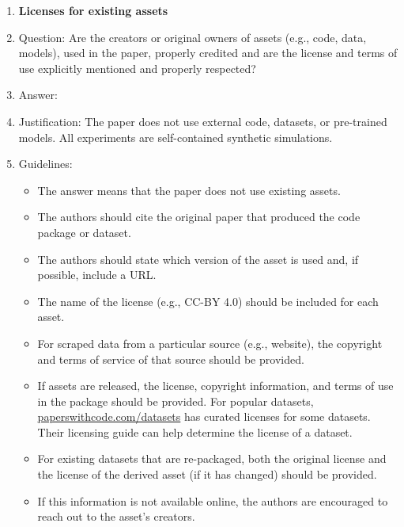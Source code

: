 \documentclass{article}
\begin{document}
\begin{enumerate}
\item {\bf Licenses for existing assets}
    \item[] Question: Are the creators or original owners of assets (e.g., code, data, models), used in the paper, properly credited and are the license and terms of use explicitly mentioned and properly respected?
    \item[] Answer: \answerNA{}
    \item[] Justification: The paper does not use external code, datasets, or pre-trained models. All experiments are self-contained synthetic simulations.
    \item[] Guidelines:
    \begin{itemize}
        \item The answer \answerNA{} means that the paper does not use existing assets.
        \item The authors should cite the original paper that produced the code package or dataset.
        \item The authors should state which version of the asset is used and, if possible, include a URL.
        \item The name of the license (e.g., CC-BY 4.0) should be included for each asset.
        \item For scraped data from a particular source (e.g., website), the copyright and terms of service of that source should be provided.
        \item If assets are released, the license, copyright information, and terms of use in the package should be provided. For popular datasets, \url{paperswithcode.com/datasets} has curated licenses for some datasets. Their licensing guide can help determine the license of a dataset.
        \item For existing datasets that are re-packaged, both the original license and the license of the derived asset (if it has changed) should be provided.
        \item If this information is not available online, the authors are encouraged to reach out to the asset's creators.
    \end{itemize}


\end{enumerate}
\end{document}
